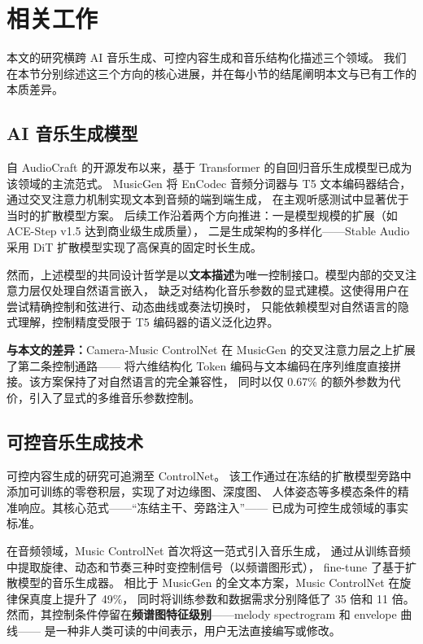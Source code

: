 \section{相关工作}

本文的研究横跨 AI 音乐生成、可控内容生成和音乐结构化描述三个领域。
我们在本节分别综述这三个方向的核心进展，并在每小节的结尾阐明本文与已有工作的本质差异。

\subsection{AI 音乐生成模型}

自 AudioCraft\cite{musicgen} 的开源发布以来，基于 Transformer 的自回归音乐生成模型已成为该领域的主流范式。
MusicGen 将 EnCodec 音频分词器与 T5 文本编码器结合，通过交叉注意力机制实现文本到音频的端到端生成，
在主观听感测试中显著优于当时的扩散模型方案。
后续工作沿着两个方向推进：一是模型规模的扩展（如 ACE-Step v1.5\cite{acestep} 达到商业级生成质量），
二是生成架构的多样化——Stable Audio\cite{stableaudio} 采用 DiT 扩散模型实现了高保真的固定时长生成。

然而，上述模型的共同设计哲学是以\textbf{文本描述}为唯一控制接口。模型内部的交叉注意力层仅处理自然语言嵌入，
缺乏对结构化音乐参数的显式建模。这使得用户在尝试精确控制和弦进行、动态曲线或奏法切换时，
只能依赖模型对自然语言的隐式理解，控制精度受限于 T5 编码器的语义泛化边界。

\textbf{与本文的差异：}Camera-Music ControlNet 在 MusicGen 的交叉注意力层之上扩展了第二条控制通路——
将六维结构化 Token 编码与文本编码在序列维度直接拼接。该方案保持了对自然语言的完全兼容性，
同时以仅 0.67\% 的额外参数为代价，引入了显式的多维音乐参数控制。

\subsection{可控音乐生成技术}

可控内容生成的研究可追溯至 ControlNet\cite{controlnet}。
该工作通过在冻结的扩散模型旁路中添加可训练的零卷积层，实现了对边缘图、深度图、
人体姿态等多模态条件的精准响应。其核心范式——“冻结主干、旁路注入”——
已成为可控生成领域的事实标准。

在音频领域，Music ControlNet\cite{musiccontrolnet} 首次将这一范式引入音乐生成，
通过从训练音频中提取旋律、动态和节奏三种时变控制信号（以频谱图形式），
fine-tune 了基于扩散模型的音乐生成器。
相比于 MusicGen 的全文本方案，Music ControlNet 在旋律保真度上提升了 49\%，
同时将训练参数和数据需求分别降低了 35 倍和 11 倍。
然而，其控制条件停留在\textbf{频谱图特征级别}——melody spectrogram 和 envelope 曲线——
是一种非人类可读的中间表示，用户无法直接编写或修改。

